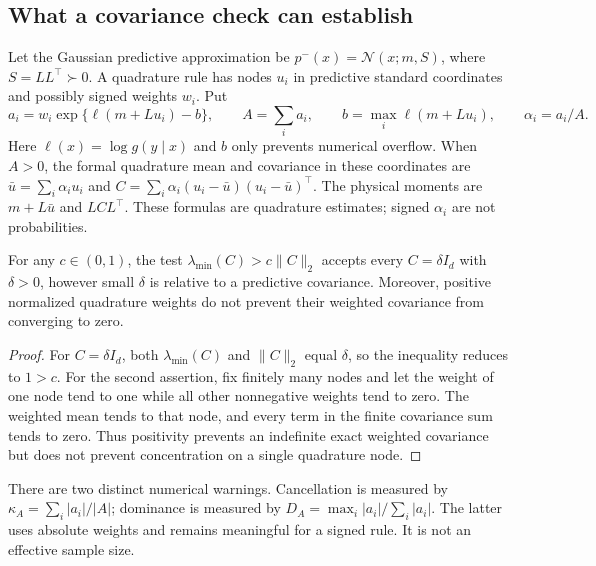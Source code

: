 \subsection{What a covariance check can establish}

Let the Gaussian predictive approximation be $p^-(x)=\mathcal N(x;m,S)$,
where $S=LL^\top\succ0$. A quadrature rule has nodes $u_i$ in predictive
standard coordinates and possibly signed weights $w_i$. Put
\begin{equation}
 a_i=w_i\exp\{\ell(m+Lu_i)-b\},\qquad
 A=\sum_i a_i,\qquad b=\max_i\ell(m+Lu_i),\qquad
 \alpha_i=a_i/A .
 \label{eq:robust-signed-weights}
\end{equation}
Here $\ell(x)=\log g(y\mid x)$ and $b$ only prevents numerical overflow.
When $A>0$, the formal quadrature mean and covariance in these coordinates
are $\bar u=\sum_i\alpha_i u_i$ and
$C=\sum_i\alpha_i(u_i-\bar u)(u_i-\bar u)^\top$.
The physical moments are $m+L\bar u$ and $LCL^\top$. These formulas are
quadrature estimates; signed $\alpha_i$ are not probabilities.

\begin{proposition}
\label{prop:robust-scale}
For any $c\in(0,1)$, the test
$\lambda_{\min}(C)>c\|C\|_2$ accepts every $C=\delta I_d$ with
$\delta>0$, however small $\delta$ is relative to a predictive covariance.
Moreover, positive normalized quadrature weights do not prevent their
weighted covariance from converging to zero.
\end{proposition}
\begin{proof}
For $C=\delta I_d$, both $\lambda_{\min}(C)$ and $\|C\|_2$ equal
$\delta$, so the inequality reduces to $1>c$. For the second assertion,
fix finitely many nodes and let the weight of one node tend to one while
all other nonnegative weights tend to zero. The weighted mean tends to that
node, and every term in the finite covariance sum tends to zero.
Thus positivity prevents an indefinite exact weighted covariance but does
not prevent concentration on a single quadrature node.
\end{proof}

There are two distinct numerical warnings. Cancellation is measured by
$\kappa_A=\sum_i|a_i|/|A|$; dominance is measured by
$D_A=\max_i|a_i|/\sum_i|a_i|$. The latter uses absolute weights and
remains meaningful for a signed rule. It is not an effective sample size.


